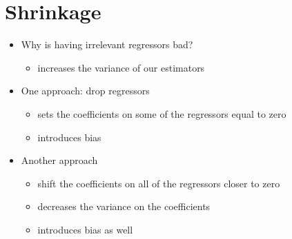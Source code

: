 \section{Shrinkage}
\begin{itemize}[leftmargin=0pt]
\item Why is having irrelevant regressors bad?
\begin{itemize}
\item increases the variance of our estimators
\end{itemize}
\item One approach: drop regressors
\begin{itemize}
\item sets the coefficients on some of the regressors equal to zero
\item introduces bias
\end{itemize}
\item Another approach
\begin{itemize}
\item shift the coefficients on all of the regressors closer to zero
\item decreases the variance on the coefficients
\item introduces bias as well
\end{itemize}
\end{itemize}

